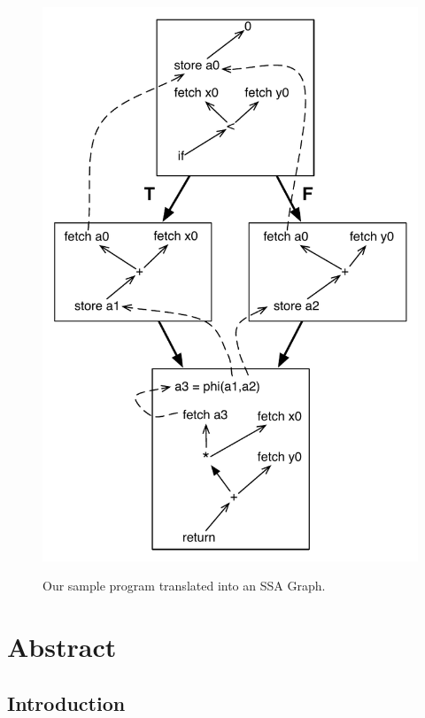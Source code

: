 \begin{figure}
\centering
\includegraphics[scale=0.5]{img/ssa-graph.pdf}
\label{fig: ssa-graph-example-graph}
\caption{Our sample program translated into an SSA Graph.}
\end{figure}


\section*{Abstract}

\subsection*{Introduction}

